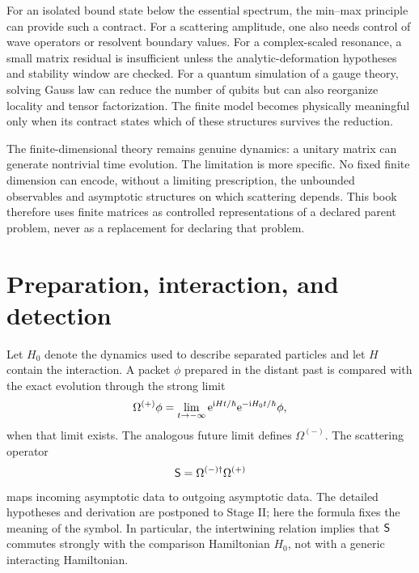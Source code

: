 For an isolated bound state below the essential spectrum, the min--max
principle can provide such a contract.  For a scattering amplitude, one also
needs control of wave operators or resolvent boundary values.  For a
complex-scaled resonance, a small matrix residual is insufficient unless the
analytic-deformation hypotheses and stability window are checked.  For a
quantum simulation of a gauge theory, solving Gauss law can reduce the number
of qubits but can also reorganize locality and tensor factorization.  The
finite model becomes physically meaningful only when its contract states
which of these structures survives the reduction.

The finite-dimensional theory remains genuine dynamics: a unitary matrix can
generate nontrivial time evolution.  The limitation is more specific.  No
fixed finite dimension can encode, without a limiting prescription, the
unbounded observables and asymptotic structures on which scattering depends.
This book therefore uses finite matrices as controlled representations of a
declared parent problem, never as a replacement for declaring that problem.

\section*{Preparation, interaction, and detection}
{}

Let $H_0$ denote the dynamics used to describe separated particles and let
$H$ contain the interaction.  A packet $\phi$ prepared in the distant past is
compared with the exact evolution through the strong limit
\begin{equation}
  \Omega^{(+)}\phi
  =\lim_{t\to-\infty}
  \mathrm{e}^{\mathrm{i} Ht/\hbar}\mathrm{e}^{-\mathrm{i} H_0t/\hbar}\phi,
  \label{eq:prologue-wave-operator}
\end{equation}
when that limit exists.  The analogous future limit defines
$\Omega^{(-)}$.  The scattering operator
\begin{equation}
  \mathsf{S}=\Omega^{(-)\dagger}\Omega^{(+)}
  \label{eq:prologue-scattering-operator}
\end{equation}
maps incoming asymptotic data to outgoing asymptotic data.  The detailed
hypotheses and derivation are postponed to Stage II; here the formula fixes
the meaning of the symbol.  In particular, the intertwining relation implies
that $\mathsf{S}$ commutes strongly with the comparison Hamiltonian $H_0$,
not with a generic interacting Hamiltonian.

